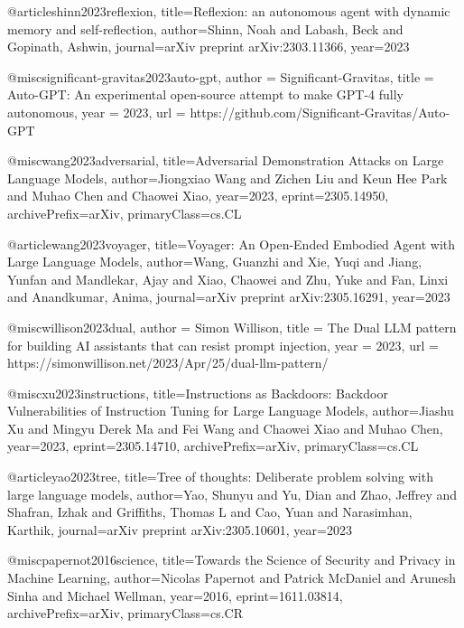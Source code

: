 @article{shinn2023reflexion,
  title={Reflexion: an autonomous agent with dynamic memory and self-reflection},
  author={Shinn, Noah and Labash, Beck and Gopinath, Ashwin},
  journal={arXiv preprint arXiv:2303.11366},
  year={2023}
}

@misc{significant-gravitas2023auto-gpt,
  author = {Significant-Gravitas},
  title = {Auto-GPT: An experimental open-source attempt to make GPT-4 fully autonomous},
  year = {2023},
  url = {https://github.com/Significant-Gravitas/Auto-GPT}
}

@misc{wang2023adversarial,
      title={Adversarial Demonstration Attacks on Large Language Models},
      author={Jiongxiao Wang and Zichen Liu and Keun Hee Park and Muhao Chen and Chaowei Xiao},
      year={2023},
      eprint={2305.14950},
      archivePrefix={arXiv},
      primaryClass={cs.CL}
}

@article{wang2023voyager,
  title={Voyager: An Open-Ended Embodied Agent with Large Language Models},
  author={Wang, Guanzhi and Xie, Yuqi and Jiang, Yunfan and Mandlekar, Ajay and Xiao, Chaowei and Zhu, Yuke and Fan, Linxi and Anandkumar, Anima},
  journal={arXiv preprint arXiv:2305.16291},
  year={2023}
}

@misc{willison2023dual,
  author = {Simon Willison},
  title = {The Dual LLM pattern for building AI assistants that can resist prompt injection},
  year = {2023},
  url = {https://simonwillison.net/2023/Apr/25/dual-llm-pattern/}
}

@misc{xu2023instructions,
      title={Instructions as Backdoors: Backdoor Vulnerabilities of Instruction Tuning for Large Language Models},
      author={Jiashu Xu and Mingyu Derek Ma and Fei Wang and Chaowei Xiao and Muhao Chen},
      year={2023},
      eprint={2305.14710},
      archivePrefix={arXiv},
      primaryClass={cs.CL}
}

@article{yao2023tree,
  title={Tree of thoughts: Deliberate problem solving with large language models},
  author={Yao, Shunyu and Yu, Dian and Zhao, Jeffrey and Shafran, Izhak and Griffiths, Thomas L and Cao, Yuan and Narasimhan, Karthik},
  journal={arXiv preprint arXiv:2305.10601},
  year={2023}
}



@misc{papernot2016science,
      title={Towards the Science of Security and Privacy in Machine Learning},
      author={Nicolas Papernot and Patrick McDaniel and Arunesh Sinha and Michael Wellman},
      year={2016},
      eprint={1611.03814},
      archivePrefix={arXiv},
      primaryClass={cs.CR}
}

